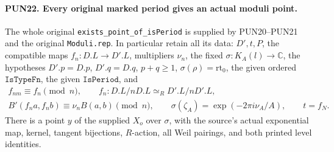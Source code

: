 \paragraph{PUN22. Every original marked period gives an actual moduli point.}
\label{claim:PUN22}
The whole original \texttt{exists\_point\_of\_isPeriod} is
supplied by PUN20--PUN21 and the original \texttt{Moduli.rep}.
In particular retain all its data: \(D',t,P\), the compatible
maps \(f_n:D.L\to D'.L\), multipliers \(\nu_n\), the fixed
\(\sigma:K_A(l)\to\mathbb C\), the hypotheses
\(D'.p=D.p\), \(D'.q=D.q\), \(p+q\ge1\),
\(\sigma(\rho)=\mathrm{rt}_0\), the given ordered
\(\texttt{IsTypeFn}\), the given \(\texttt{IsPeriod}\), and
\[
 \begin{gathered}
 f_{nm}\equiv f_n\pmod n,\qquad
 f_n:D.L/nD.L\simeq_R D'.L/nD'.L,\\
 B'(f_na,f_nb)\equiv\nu_nB(a,b)\pmod n,\qquad
 \sigma(\zeta_A)=\exp(-2\pi i\nu_A/A),\qquad t=f_N.
 \end{gathered}                                                   \tag{PUN.39}
\]
There is a point \(y\) of the supplied \(X_o\) over
\(\sigma\), with the source's actual exponential map,
kernel, tangent bijections, \(R\)-action, all Weil pairings,
and both printed level identities.

